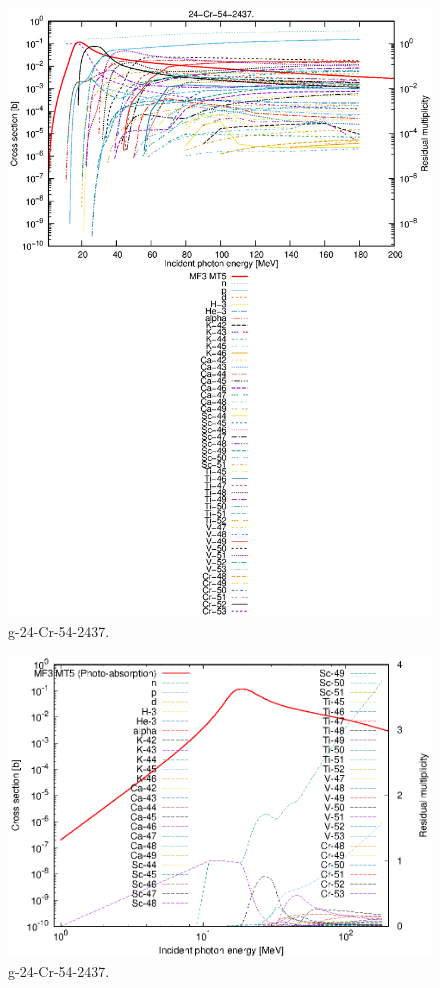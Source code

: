 \begin{figure}
 \includegraphics[width=\linewidth]{eps/g_24-Cr-54_2437.eps}
  \caption{g-24-Cr-54-2437.}
\end{figure}
\newpage \clearpage

\begin{figure}
 \includegraphics[width=\linewidth]{eps-log/g_24-Cr-54_2437.eps}
 \caption{g-24-Cr-54-2437.}
\end{figure}
\newpage \clearpage

